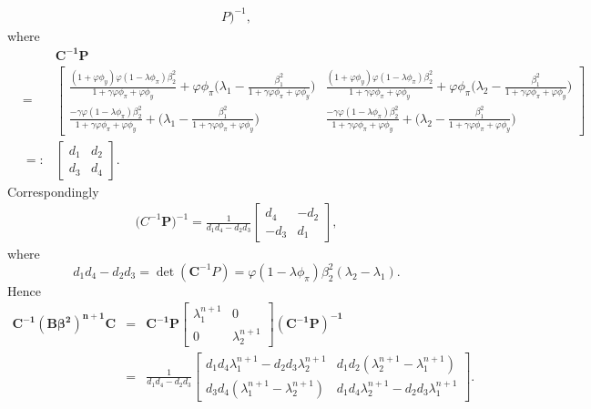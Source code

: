 \begin{appendix}
\begin{eqnarray*}
{P})^{-1},
\end{eqnarray*}
where
\begin{eqnarray*}
&&\pmb{C^{-1}P}\\
&=&\left[\begin{array}{cc}
\frac{(1+\varphi\phi_y)\varphi(1-\lambda\phi_\pi)\beta_2^2}{1+\gamma\varphi\phi_\pi+\varphi\phi_y}+\varphi\phi_\pi\Big(\lambda_1-\frac{\beta_1^2}{1+\gamma\varphi\phi_\pi+\varphi\phi_y}\Big)&\frac{(1+\varphi\phi_y)\varphi(1-\lambda\phi_\pi)\beta_2^2}{1+\gamma\varphi\phi_\pi+\varphi\phi_y}+\varphi\phi_\pi\Big(\lambda_2-\frac{\beta_1^2}{1+\gamma\varphi\phi_\pi+\varphi\phi_y}\Big)\\
\frac{-\gamma\varphi(1-\lambda\phi_\pi)\beta_2^2}{1+\gamma\varphi\phi_\pi+\varphi\phi_y}+\Big(\lambda_1-\frac{\beta_1^2}{1+\gamma\varphi\phi_\pi+\varphi\phi_y}\Big)&\frac{-\gamma\varphi(1-\lambda\phi_\pi)\beta_2^2}{1+\gamma\varphi\phi_\pi+\varphi\phi_y}+\Big(\lambda_2-\frac{\beta_1^2}{1+\gamma\varphi\phi_\pi+\varphi\phi_y}\Big)
\end{array}\right]\\
&=:&\left[\begin{array}{cc} d_1&d_2\\
d_3&d_4
\end{array}\right].
\end{eqnarray*}
Correspondingly
\begin{eqnarray*} {\pmb(C}^{-1}{\pmb
P})^{-1}=\frac{1}{d_1d_4-d_2d_3}\left[\begin{array}{cc}
d_4&-d_2\\
-d_3&d_1
\end{array}\right],
\end{eqnarray*}
where
$$d_1d_4-d_2d_3=\det({\pmb C^{-1}P})=\varphi(1-\lambda\phi_\pi)\beta_2^2(\lambda_2-\lambda_1).$$
Hence
\begin{eqnarray*}
\pmb{C^{-1}(B\beta^2)^{n+1}C}&=&\pmb{C^{-1}P}\left[\begin{array}{cc}
\lambda_1^{n+1}&0\\
0&\lambda_2^{n+1}
\end{array}\right]\pmb{(C^{-1}P)^{-1}}\\
&=&\frac{1}{d_1d_4-d_2d_3}\left[\begin{array}{cc}
d_1d_4\lambda_1^{n+1}-d_2d_3\lambda_2^{n+1}&d_1d_2(\lambda_2^{n+1}-\lambda_1^{n+1})\\
d_3d_4(\lambda_1^{n+1}-\lambda_2^{n+1})&d_1d_4\lambda_2^{n+1}-d_2d_3\lambda_1^{n+1}
\end{array}\right].
\end{eqnarray*}

\end{appendix}
